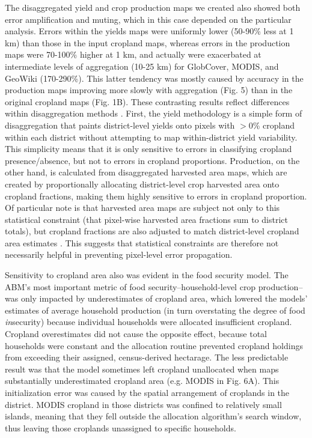 \documentclass[a4paper]{article}
\begin{document}
The disaggregated yield and crop production maps we created also showed both error amplification and muting, which in this case depended on the particular analysis. Errors within the yields maps were uniformly lower (50-90\% less at 1 km) than those in the input cropland maps, whereas errors in the production maps were 70-100\% higher at 1 km, and actually were exacerbated at intermediate levels of aggregation (10-25 km) for GlobCover, MODIS, and GeoWiki (170-290\%). This latter tendency was mostly caused by accuracy in the production maps improving more slowly with aggregation (Fig. 5) than in the original cropland maps (Fig. 1B). These contrasting results reflect differences within disaggregation methods \citep{monfreda_farming_2008}. First, the yield methodology is a simple form of disaggregation that paints district-level yields onto pixels with $>$0\% cropland within each district without attempting to map within-district yield variability.  This simplicity means that it is only sensitive to errors in classifying cropland presence/absence, but not to errors in cropland proportions. Production, on the other hand, is calculated from disaggregated harvested area maps, which are created by proportionally allocating district-level crop harvested area onto cropland fractions, making them highly sensitive to errors in cropland proportion. Of particular note is that harvested area maps are subject not only to this statistical constraint (that pixel-wise harvested area fractions sum to district totals), but cropland fractions are also adjusted to match district-level cropland area estimates \citep[see Methods; ][]{ramankutty_farming_2008}. This suggests that statistical constraints are therefore not necessarily helpful in preventing pixel-level error propagation.

Sensitivity to cropland area also was evident in the food security model. The ABM's most important metric of food security--household-level crop production--was only impacted by underestimates of cropland area, which lowered the models' estimates of average household production (in turn overstating the degree of food \emph{in}security) because individual households were allocated insufficient cropland. Cropland overestimates did not cause the opposite effect, because total households were constant and the allocation routine prevented cropland holdings from exceeding their assigned, census-derived hectarage. The less predictable result was that the model sometimes left cropland unallocated when maps substantially underestimated cropland area (e.g. MODIS in Fig. 6A). This initialization error was caused by the spatial arrangement of croplands in the district. MODIS cropland in those districts was confined to relatively small islands, meaning that they fell outside the allocation algorithm's search window, thus leaving those croplands unassigned to specific households. 
\end{document}
